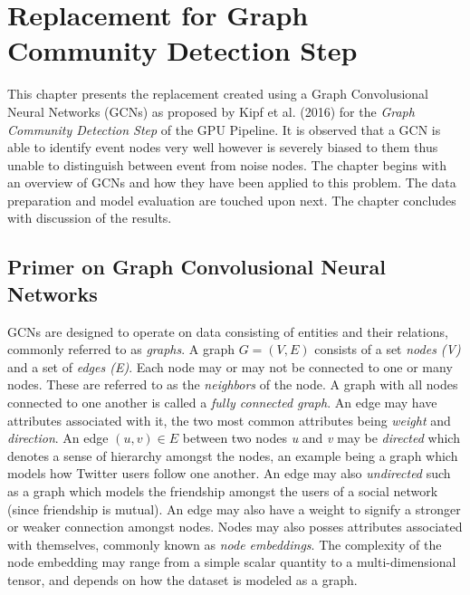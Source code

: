 
\chapter{Replacement for Graph Community Detection Step} %
\label{cha:gcn}
% 

This chapter presents the replacement created using a Graph
Convolusional Neural Networks (GCNs) as proposed by Kipf et al. (2016)
for the \emph{Graph Community Detection Step} of the GPU Pipeline. It
is observed that a GCN is able to identify event nodes very well
however is severely biased to them thus unable to distinguish between
event from noise nodes. The chapter begins with an overview of GCNs
and how they have been applied to this problem. The data preparation
and model evaluation are touched upon next. The chapter concludes with
discussion of the results.

\section{Primer on Graph Convolusional Neural Networks}
\label{sec:gcn-primer}

GCNs are designed to operate on data consisting of entities and their
relations, commonly referred to as \emph{graphs}. A graph $G = (V, E)$
consists of a set \emph{nodes (V)} and a set of \emph{edges (E)}. Each
node may or may not be connected to one or many nodes. These are
referred to as the \emph{neighbors} of the node. A graph with all
nodes connected to one another is called a \emph{fully connected
graph}. An edge may have attributes associated with it, the two most
common attributes being \emph{weight} and \emph{direction}. An edge
$(u, v) \in E$ between two nodes \emph{u} and \emph{v} may be
\emph{directed} which denotes a sense of hierarchy amongst the nodes,
an example being a graph which models how Twitter users follow one
another. An edge may also \emph{undirected} such as a graph which
models the friendship amongst the users of a social network (since
friendship is mutual). An edge may also have a weight to signify a
stronger or weaker connection amongst nodes. Nodes may also posses
attributes associated with themselves, commonly known as \emph{node
embeddings}. The complexity of the node embedding may range from a
simple scalar quantity to a multi-dimensional tensor, and depends on
how the dataset is modeled as a graph.

